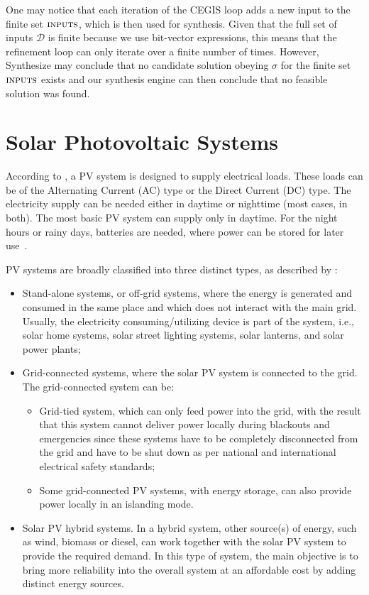 One may notice that each iteration of the CEGIS loop adds a new input to the finite set $\text{\sc inputs}$, which is then used for synthesis.  Given that the full set of inputs $\mathcal{D}$ is finite because we use bit-vector expressions, this means that the refinement loop can only iterate over a finite number of times. However, {\sc Synthesize} may conclude that no candidate solution obeying $\sigma$ for the finite set $\text{\sc inputs}$ exists and our synthesis engine can then conclude that no feasible solution was found.

\section{Solar Photovoltaic Systems}

According to \cite{Roy}, a PV system is designed to supply electrical loads. These loads can be of the Alternating Current (AC) type or the Direct Current (DC) type. The electricity supply can be needed either in daytime or nighttime (most cases, in both). The most basic PV system can supply only in daytime.  For the night hours or rainy days, batteries are needed, where power can be stored for later use~\cite{Gules}. 

PV systems are broadly classified into three distinct types, as described by \cite{Mohanty}: 

\begin{itemize}
\item Stand-alone systems, or off-grid systems, where the energy is generated and consumed in the same place and which does not interact with the main grid. Usually, the electricity consuming/utilizing device is part of the system, i.e., solar home systems, solar street lighting systems, solar lanterns, and solar power plants; 
\item Grid-connected systems, where the solar PV system is connected to the grid. The grid-connected system can be: 
\begin{itemize}
\item Grid-tied system, which can only feed power into the grid, with the result that this system cannot deliver power locally during blackouts and emergencies since these systems have to be completely disconnected from the grid and have to be shut down as per national and international electrical safety standards;
\item Some grid-connected PV systems, with energy storage, can also provide power locally in an islanding mode. 
\end{itemize}
\item Solar PV hybrid systems. In a hybrid system, other source(s) of energy, such as wind, biomass or diesel, can work together with the solar PV system to provide the required demand. In this type of system, the main objective is to bring more reliability into the overall system at an affordable cost by adding distinct energy sources.
\end{itemize}
 
